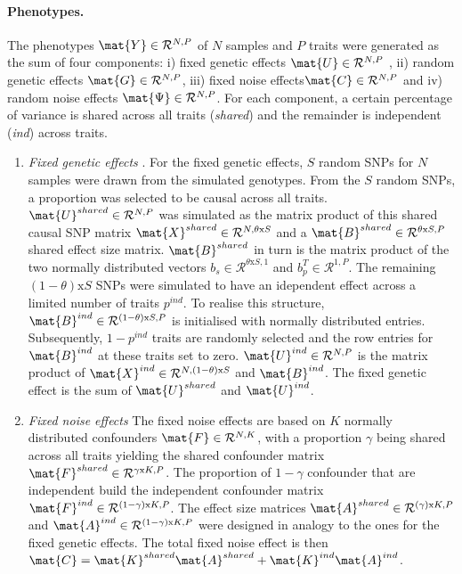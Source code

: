 \paragraph{Phenotypes.} The phenotypes \( \mat{Y} \in \mathcal{R}^{N,P}\) of \(N\) samples and \(P\) traits were generated as the sum of four components: i) fixed genetic effects \( \mat{U} \in \mathcal{R}^{N,P}\) , ii) random genetic effects \( \mat{G} \in \mathcal{R}^{N,P}\), iii) fixed noise effects\( \mat{C} \in \mathcal{R}^{N,P}\) and iv) random noise effects \( \mat{\Psi} \in \mathcal{R}^{N,P}\). For each component, a certain percentage of variance is shared across all traits (\textit{shared}) and the remainder is independent (\textit{ind}) across traits.

\begin{enumerate}
\item \textit{Fixed genetic effects }. For the fixed genetic effects,  \(S\) random SNPs for \(N\) samples were drawn from the simulated genotypes. From the \(S\) random SNPs, a proportion \tbm{\theta} was selected to be causal across all traits. \(\mat{U}^{shared} \in \mathcal{R}^{N,P}\) was simulated as the matrix product of this shared causal SNP matrix \(\mat{X}^{shared} \in \mathcal{R}^{N,\theta  \text{x} S}\) and a \(\mat{B}^{shared} \in \mathcal{R}^{\theta  \text{x} S, P}\) shared effect size matrix. \(\mat{B}^{shared}\) in turn is the matrix product of the two normally distributed vectors \(b_s \in \mathcal{R}^{\theta  \text{x} S,1}\) and \(b_p^T \in \mathcal{R}^{1,P}\). The remaining \((1- \theta ) \text{x} S\) SNPs were simulated to have an idependent effect across a limited number of traits \(p^{ind}\). To realise this structure, \(\mat{B}^{ind}  \in \mathcal{R}^{(1-\theta)  \text{x} S, P}\) is initialised with normally distributed entries. Subsequently, \(1 - p^{ind}\) traits are randomly selected and the row entries for \(\mat{B}^{ind}\) at these traits set to zero. \(\mat{U}^{ind} \in \mathcal{R}^{N,P}\) is the matrix product of  \(\mat{X}^{ind} \in \mathcal{R}^{N,(1 - \theta)  \text{x} S}\)  and \(\mat{B}^{ind}\).
The fixed genetic effect  is the sum of \(\mat{U}^{shared}\) and \(\mat{U}^{ind}\).

\item \textit{Fixed noise effects } The fixed noise effects are based on \(K\) normally distributed confounders \(\mat{F} \in \mathcal{R}^{N,K}\), with a proportion \(\gamma\) being shared across all traits yielding the shared confounder matrix \(\mat{F}^{shared} \in \mathcal{R}^{\gamma  \text{x} K, P}\). The proportion of \(1- \gamma\) confounder that are independent build the independent confounder matrix \(\mat{F}^{ind} \in \mathcal{R}^{(1-\gamma)  \text{x} K, P}\). The effect size matrices  \(\mat{A}^{shared}  \in \mathcal{R}^{(\gamma)  \text{x} K, P}\)  and \(\mat{A}^{ind}  \in \mathcal{R}^{(1-\gamma)  \text{x} K, P}\) were designed in analogy to the ones for the fixed genetic effects. The total fixed noise effect is then \(\mat{C} = \mat{K}^{shared}\mat{A}^{shared} +  \mat{K}^{ind}\mat{A}^{ind}\).


\end{enumerate}
